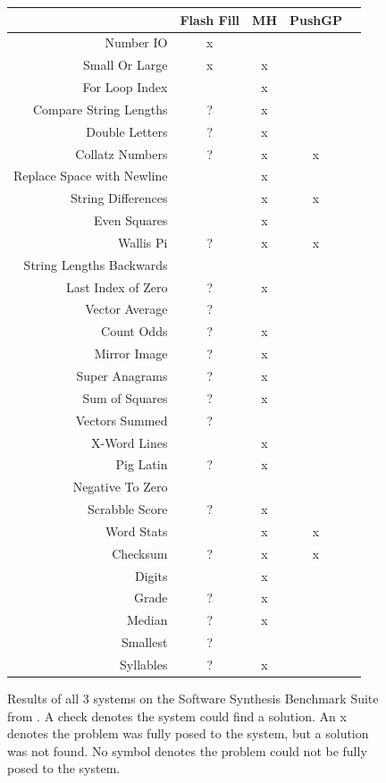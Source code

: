 \begin{figure}
\begin{tabular}{ r | c c c c }
	& Flash Fill & MH & PushGP \\
	\hline
	Number IO & x & \checkmark & \checkmark  \\
	Small Or Large & x & x & \checkmark  \\
	For Loop Index &   & x & \checkmark  \\
	Compare String Lengths & ? & x & \checkmark  \\
	Double Letters & ? & x & \checkmark  \\
	Collatz Numbers & ? & x & x \\
	Replace Space with Newline &   & x & \checkmark  \\
	String Differences &   & x & x \\
	Even Squares &   & x & \checkmark  \\
	Wallis Pi & ? & x & x \\
	String Lengths Backwards &   & \checkmark  & \checkmark \\
	Last Index of Zero & ? & x & \checkmark  \\
	Vector Average & ? & \checkmark & \checkmark  \\
	Count Odds & ? & x & \checkmark  \\
	Mirror Image & ? & x & \checkmark  \\
	Super Anagrams & ? & x & \checkmark  \\
	Sum of Squares & ? & x & \checkmark  \\
	Vectors Summed & ? & \checkmark & \checkmark  \\
	X-Word Lines &   & x & \checkmark  \\
	Pig Latin & ? & x & \checkmark  \\
	Negative To Zero &   & \checkmark & \checkmark  \\
	Scrabble Score & ? & x & \checkmark  \\
	Word Stats &   & x & x \\
	Checksum & ? & x & x \\
	Digits &   & x & \checkmark  \\
	Grade & ? & x & \checkmark  \\
	Median & ? & x & \checkmark  \\
	Smallest & ? & \checkmark & \checkmark  \\
	Syllables & ? & x & \checkmark  \\
\end{tabular}
\caption{Results of all 3 systems on the Software Synthesis Benchmark Suite from \cite{Helmuth2015b}. A check denotes the system could find a solution. An x denotes the problem was fully posed to the system, but a solution was not found. No symbol denotes the problem could not be fully posed to the system.}
\label{fig:results2}
\end{figure}




